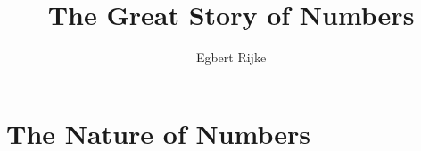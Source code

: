 \documentclass[
  11pt,
  letterpaper,
  twoside,
  openright,
]{book}
\title{The Great Story of Numbers}
\author{Egbert Rijke}
\theoremstyle{definition}
\theoremstyle{remark}
\newif\ifshownotes
\newcommand{\note}[1]{%
  \ifshownotes
    \begingroup\color{black!60}#1\endgroup
  \fi
}
\begin{document}
%


%


%


\hypersetup{pageanchor=true}

\pagestyle{fancy}

\tableofcontents

\listoffigures

\listoftables



\mainmatter

\part{The Nature of Numbers}


























%

%

%


%

%

%

%
\end{document}
